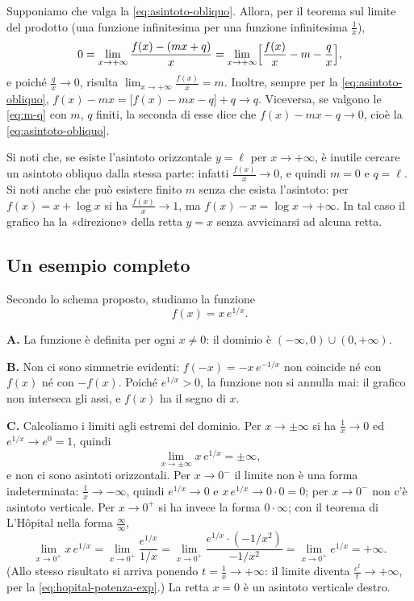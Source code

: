 \begin{dimostrazione}
Supponiamo che valga la \eqref{eq:asintoto-obliquo}. Allora, per il teorema sul limite
del prodotto (una funzione infinitesima per una funzione infinitesima $\frac1x$),
\[
  0=\lim_{x\to+\infty}\frac{f(x)-(mx+q)}{x}=\lim_{x\to+\infty}\Bigl[\frac{f(x)}{x}-m-\frac qx\Bigr],
\]
e poiché $\frac qx\to0$, risulta $\lim_{x\to+\infty}\frac{f(x)}x=m$. Inoltre, sempre per la
\eqref{eq:asintoto-obliquo}, $f(x)-mx=\bigl[f(x)-mx-q\bigr]+q\to q$. Viceversa, se
valgono le \eqref{eq:m-q} con $m$, $q$ finiti, la seconda di esse dice che
$f(x)-mx-q\to0$, cioè la \eqref{eq:asintoto-obliquo}.
\end{dimostrazione}

Si noti che, se esiste l'asintoto orizzontale $y=\ell$ per $x\to+\infty$, è inutile
cercare un asintoto obliquo dalla stessa parte: infatti $\frac{f(x)}x\to0$, e quindi
$m=0$ e $q=\ell$. Si noti anche che può esistere finito $m$ senza che esista l'asintoto:
per $f(x)=x+\log x$ si ha $\frac{f(x)}x\to1$, ma $f(x)-x=\log x\to+\infty$. In tal caso
il grafico ha la «direzione» della retta $y=x$ senza avvicinarsi ad alcuna retta.

\subsection{Un esempio completo}

Secondo lo schema proposto, studiamo la funzione
\begin{equation}\label{eq:studio-xe1x}
  f(x)=x\,e^{1/x} .
\end{equation}

\textbf{A.} La funzione è definita per ogni $x\neq0$: il dominio è
$(-\infty,0)\cup(0,+\infty)$.

\textbf{B.} Non ci sono simmetrie evidenti: $f(-x)=-x\,e^{-1/x}$ non coincide né con
$f(x)$ né con $-f(x)$. Poiché $e^{1/x}>0$, la funzione non si annulla mai: il grafico non
interseca gli assi, e $f(x)$ ha il segno di $x$.

\textbf{C.} Calcoliamo i limiti agli estremi del dominio. Per $x\to\pm\infty$ si ha
$\frac1x\to0$ ed $e^{1/x}\to e^{0}=1$, quindi
\[
  \lim_{x\to\pm\infty}x\,e^{1/x}=\pm\infty ,
\]
e non ci sono asintoti orizzontali. Per $x\to0^{-}$ il limite non è una forma
indeterminata: $\frac1x\to-\infty$, quindi $e^{1/x}\to0$ e $x\,e^{1/x}\to0\cdot0=0$; per
$x\to0^{-}$ non c'è asintoto verticale. Per $x\to0^{+}$ si ha invece la forma
$0\cdot\infty$; con il teorema di L'Hôpital nella forma $\frac\infty\infty$,
\[
  \lim_{x\to0^{+}}x\,e^{1/x}=\lim_{x\to0^{+}}\frac{e^{1/x}}{1/x}
  =\lim_{x\to0^{+}}\frac{e^{1/x}\cdot(-1/x^{2})}{-1/x^{2}}=\lim_{x\to0^{+}}e^{1/x}=+\infty .
\]
(Allo stesso risultato si arriva ponendo $t=\frac1x\to+\infty$: il limite diventa
$\frac{e^{t}}{t}\to+\infty$, per la \eqref{eq:hopital-potenza-exp}.) La retta $x=0$ è un
asintoto verticale destro.

